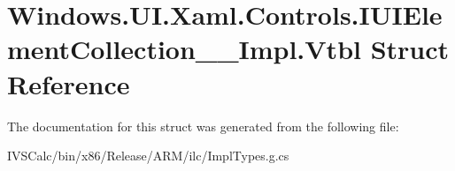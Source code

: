 \hypertarget{struct_windows_1_1_u_i_1_1_xaml_1_1_controls_1_1_i_u_i_element_collection_____impl_1_1_vtbl}{}\section{Windows.\+U\+I.\+Xaml.\+Controls.\+I\+U\+I\+Element\+Collection\+\_\+\+\_\+\+Impl.\+Vtbl Struct Reference}
\label{struct_windows_1_1_u_i_1_1_xaml_1_1_controls_1_1_i_u_i_element_collection_____impl_1_1_vtbl}


The documentation for this struct was generated from the following file\+:\begin{DoxyCompactItemize}
\item 
I\+V\+S\+Calc/bin/x86/\+Release/\+A\+R\+M/ilc/Impl\+Types.\+g.\+cs\end{DoxyCompactItemize}
